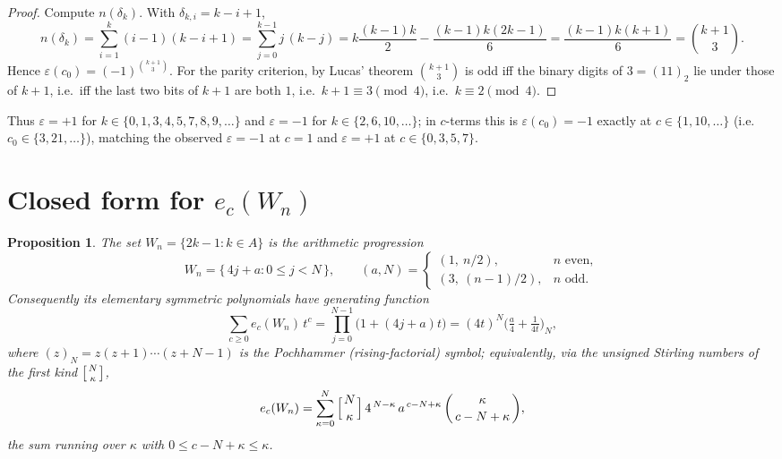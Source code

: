 \documentclass[11pt]{article}
\newtheorem{proposition}{Proposition}
\theoremstyle{definition}
\begin{document}
\begin{proof}
Compute $n(\delta_k)$. With $\delta_{k,i}=k-i+1$,
\[
  n(\delta_k)=\sum_{i=1}^{k}(i-1)(k-i+1)
            =\sum_{j=0}^{k-1}j\,(k-j)
            =k\frac{(k-1)k}{2}-\frac{(k-1)k(2k-1)}{6}
            =\frac{(k-1)k(k+1)}{6}=\binom{k+1}{3}.
\]
Hence $\varepsilon(c_0)=(-1)^{\binom{k+1}{3}}$. For the parity criterion, by
Lucas' theorem $\binom{k+1}{3}$ is odd iff the binary digits of $3=(11)_2$ lie
under those of $k+1$, i.e.\ iff the last two bits of $k+1$ are both $1$, i.e.\
$k+1\equiv 3\pmod 4$, i.e.\ $k\equiv 2\pmod 4$.
\end{proof}

Thus $\varepsilon=+1$ for $k\in\{0,1,3,4,5,7,8,9,\dots\}$ and $\varepsilon=-1$
for $k\in\{2,6,10,\dots\}$; in $c$-terms this is $\varepsilon(c_0)=-1$ exactly at
$c\in\{1,10,\dots\}$ (i.e.\ $c_0\in\{3,21,\dots\}$), matching the observed
$\varepsilon=-1$ at $c=1$ and $\varepsilon=+1$ at $c\in\{0,3,5,7\}$.

\section{Closed form for $e_c(W_n)$}\label{sec:ec}

\begin{proposition}\label{prop:ec}
The set $W_n=\{2k-1:k\in A\}$ is the arithmetic progression
\[
  W_n=\{\,4j+a:0\le j<N\,\},\qquad
  (a,N)=\begin{cases}(1,\ n/2),&n\text{ even},\\[2pt](3,\ (n-1)/2),&n\text{ odd}.\end{cases}
\]
Consequently its elementary symmetric polynomials have generating function
\[
  \sum_{c\ge0}e_c(W_n)\,t^{c}
   =\prod_{j=0}^{N-1}\big(1+(4j+a)t\big)
   =(4t)^{N}\Big(\tfrac{a}{4}+\tfrac{1}{4t}\Big)_{N},
\]
where $(z)_N=z(z+1)\cdots(z+N-1)$ is the Pochhammer (rising-factorial) symbol;
equivalently, via the unsigned Stirling numbers of the first kind
$\big[{N\atop \kappa}\big]$,
\[
  e_c(W_n)=\sum_{\kappa=0}^{N}\Big[{N\atop \kappa}\Big]\,
            4^{\,N-\kappa}\,a^{\,c-N+\kappa}\,\binom{\kappa}{\,c-N+\kappa\,},
\]
the sum running over $\kappa$ with $0\le c-N+\kappa\le \kappa$.
\end{proposition}
\end{document}
